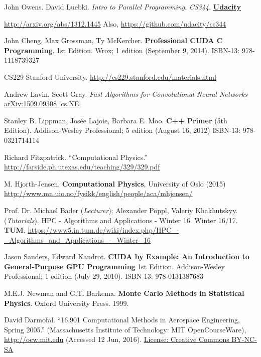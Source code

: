 \documentclass[10pt]{amsart}
\begin{document}
\begin{thebibliography}{9}
John Owens.  David Luebki.  \emph{Intro to Parallel Programming}.  \emph{CS344}.  \textbf{\href{https://www.udacity.com/}{Udacity}}  
  
\url{http://arxiv.org/abs/1312.1445} Also, \url{https://github.com/udacity/cs344}  

John Cheng, Max Grossman, Ty McKercher.  \textbf{Professional CUDA C Programming}.  1st Edition.  Wrox; 1 edition (September 9, 2014).  ISBN-13: 978-1118739327



CS229 Stanford University.  \url{http://cs229.stanford.edu/materials.html}



Andrew Lavin, Scott Gray.  \emph{Fast Algorithms for Convolutional Neural Networks} \href{https://arxiv.org/abs/1509.09308}{arXiv:1509.09308 [cs.NE]}


Stanley B. Lippman, Jos\'{e}e Lajoie, Barbara E. Moo. \textbf{C++ Primer} (5th Edition).  Addison-Wesley Professional; 5 edition (August 16, 2012) ISBN-13: 978-0321714114 



Richard Fitzpatrick.  ``Computational Physics.''  \url{http://farside.ph.utexas.edu/teaching/329/329.pdf}

 M. Hjorth-Jensen, \textbf{Computational Physics}, University of Oslo (2015) \url{http://www.mn.uio.no/fysikk/english/people/aca/mhjensen/}

Prof. Dr. Michael Bader (\emph{Lecturer});  Alexander Pöppl, Valeriy Khakhutskyy.  (\emph{Tutorials}).  HPC - Algorithms and Applications - Winter 16.  Winter 16/17.  \textbf{TUM}.  \url{https://www5.in.tum.de/wiki/index.php/HPC_-_Algorithms_and_Applications_-_Winter_16}  

 
Jason Sanders, Edward Kandrot.  \textbf{CUDA by Example: An Introduction to General-Purpose GPU Programming} 1st Edition.  Addison-Wesley Professional; 1 edition (July 29, 2010).  ISBN-13: 978-0131387683



M.E.J. Newman and G.T. Barkema.  \textbf{Monte Carlo Methods in Statistical Physics}.  Oxford University Press.  1999.  


  David Darmofal. ``16.901 Computational Methods in Aerospace Engineering, Spring 2005.'' (Massachusetts Institute of Technology: MIT OpenCourseWare), \url{http://ocw.mit.edu} (Accessed 12 Jun, 2016). \href{http://creativecommons.org/licenses/by-nc-sa/4.0/}{License: Creative Commons BY-NC-SA}


\end{thebibliography}
\end{document}
